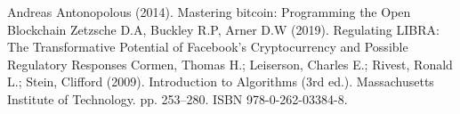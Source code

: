 \documentclass[conference]{IEEEtran}
\begin{document}
\begin{thebibliography}{00}
 Andreas Antonopolous (2014). Mastering bitcoin: Programming the Open Blockchain
 Zetzsche D.A, Buckley R.P, Arner D.W (2019). Regulating LIBRA: The Transformative Potential of Facebook’s Cryptocurrency and Possible Regulatory Responses
 Cormen, Thomas H.; Leiserson, Charles E.; Rivest, Ronald L.; Stein, Clifford (2009). Introduction to Algorithms (3rd ed.). Massachusetts Institute of Technology. pp. 253–280. ISBN 978-0-262-03384-8.
\end{thebibliography}
\end{document}
